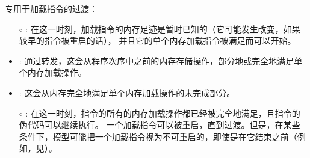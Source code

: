 \noindent 专用于加载指令的过渡：
\begin{itemize}
\item[$\circ$] : 在这一时刻，加载指令的内存足迹是暂时已知的（它可能发生改变，如果较早的指令被重启的话），
  并且它的单个内存加载指令被满足而可以开始。
\item {}: 通过转发，这会从程序次序中之前的内存存储操作，部分地或完全地满足单个内存加载操作。
\item {}: 这会从内存完全地满足单个内存加载操作的未完成部分。
\item[$\circ$] : 在这一时刻，指令的所有的内存加载操作都已经被完全地满足，且指令的伪代码可以继续执行。
  一个加载指令可以被重启，直到过渡。但是，在某些条件下，模型可能把一个加载指令视为不可重启的，即使是在它结束之前（例如，见）。
\end{itemize}

